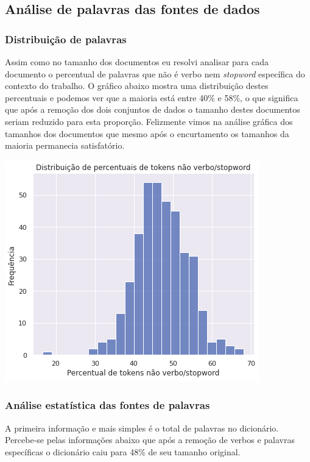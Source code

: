 \subsection{Análise de palavras das fontes de dados}

\subsubsection{Distribuição de palavras}

Assim como no tamanho dos documentos eu resolvi analisar para cada documento o percentual de palavras que não é verbo nem 
\textit{stopword} específica do contexto do trabalho. O gráfico abaixo mostra uma distribuição destes percentuais e podemos ver que a 
maioria está entre 40\% e 58\%, o que significa que após a remoção dos dois conjuntos de dados o tamanho destes documentos seriam 
reduzido para esta proporção. Felizmente vimos na análise gráfica dos tamanhos dos documentos que mesmo após o encurtamento os tamanhos
da maioria permanecia satisfatório.

\includegraphics[scale=0.75]{explore/resources/analise_palavras_distribuicao_perc_nao_verbo_stopword.png}

\subsubsection{Análise estatística das fontes de palavras}

A primeira informação e mais simples é o total de palavras no dicionário. Percebe-se pelas informações abaixo que após a remoção de verbos 
e palavras específicas o dicionário caiu para 48\% de seu tamanho original.

